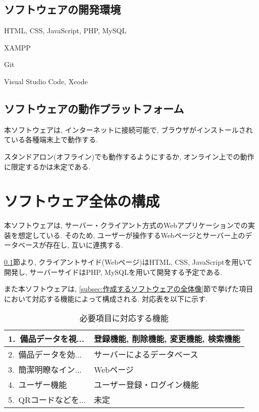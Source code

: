 \documentclass[11ptm]{jsarticle}
\begin{document}
\subsection{ソフトウェアの開発環境}
\label{subsec:ソフトウェアの開発環境}
\begin{description}[labelwidth=9em]
  \item[使用言語] HTML, CSS, JavaScript, PHP, MySQL
  \item[使用フレームワーク] XAMPP
  \item[使用ミドルウェア] Git
  \item[使用開発環境] Visual Studio Code, Xcode
\end{description}

\subsection{ソフトウェアの動作プラットフォーム}
\label{subsec:ソフトウェアの動作プラットフォーム}
本ソフトウェアは, インターネットに接続可能で, ブラウザがインストールされている各種端末上で動作する. \par
スタンドアロン(オフライン)でも動作するようにするか, オンライン上での動作に限定するかは未定である. 


\newpage
\section{ソフトウェア全体の構成}
\label{sec:ソフトウェア全体の構成}
本ソフトウェアは, サーバー・クライアント方式のWebアプリケーションでの実装を想定している. そのため, ユーザーが操作するWebページとサーバー上のデータベースが存在し, 互いに連携する. \par
\ref{subsec:ソフトウェアの開発環境}節より, クライアントサイド(Webページ)はHTML, CSS, JavaScriptを用いて開発し, サーバーサイドはPHP, MySQLを用いて開発する予定である. \par
また本ソフトウェアは, \ref{subsec:作成するソフトウェアの全体像}節で挙げた項目において対応する機能によって構成される. 対応表を以下に示す. 
\begin{table}[h]
  \caption{必要項目に対応する機能}
  \label{tb:必要項目に対応する機能}
  \centering
  \begin{tabularx}{\linewidth}{l|l}
    1.\ 備品データを視... & 登録機能, 削除機能, 変更機能, 検索機能 \\
    \hline
    2.\ 備品データを効... & サーバーによるデータベース \\
    \hline
    3.\ 簡潔明瞭なイン... & Webページ \\
    \hline
    4.\ ユーザー機能 & ユーザー登録・ログイン機能 \\
    \hline
    5.\ QRコードなどを... & 未定 \\
  \end{tabularx}
\end{table}
\end{document}
